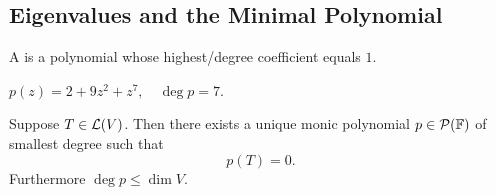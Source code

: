 \subsection{Eigenvalues and the Minimal Polynomial}

\begin{mydef} 
  A  is a polynomial whose highest\-/degree coefficient equals $1$.
\end{mydef}
\begin{example}
  $p(z)=2+9z^2+z^7, \quad \deg p = 7$.
\end{example}

\begin{thm}
  \label{thm: unique monice polynomial of smallest degree}
  Suppose $T\in \mathcal{L}(V)$. Then there exists a unique monic polynomial $p\in \mathcal{P}(\mathbb{F})$ of smallest degree such that
  \begin{equation}
    p(T)=0.
  \end{equation}
  Furthermore $\deg p \leq \dim V$.
\end{thm}

